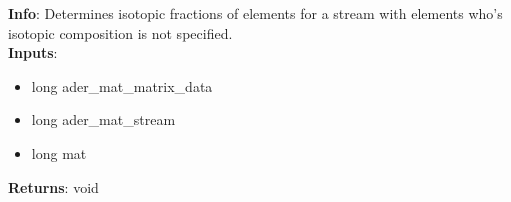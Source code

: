 \textbf{Info}: Determines isotopic fractions of elements for a stream with
elements who's isotopic composition is not specified. \\

\noindent \textbf{Inputs}:
\begin{itemize}
\item{long ader\_mat\_matrix\_data}
\item{long ader\_mat\_stream}
\item{long mat}
\end{itemize}

\noindent \textbf{Returns}: void
